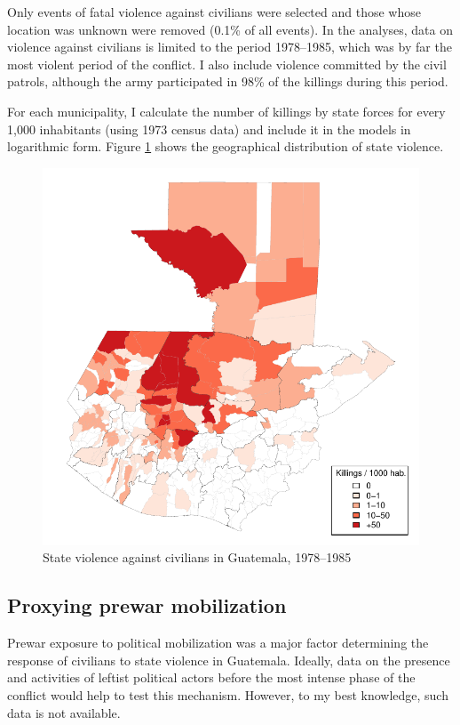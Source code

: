 \documentclass[12pt, notitlepage]{article}
\begin{document}

Only events of fatal violence against civilians were selected and those whose location was unknown were removed (0.1\% of all events).
In the analyses, data on violence against civilians is limited to the period 1978--1985, which was by far the most violent period of the conflict.
I also include violence committed by the civil patrols, although the army participated in 98\% of the killings during this period.

For each municipality, I calculate the number of killings by state forces for every 1,000 inhabitants (using 1973 census data) and include it in the models in logarithmic form.
Figure \ref{fig:map_govt_vi} shows the geographical distribution of state violence.

\begin{figure}[htb!]
  \centering
    \includegraphics[width = .4\textwidth]{img/map_govt_vi}

  \caption{State violence against civilians in Guatemala, 1978--1985} \label{fig:map_govt_vi}

\end{figure}

\subsection*{Proxying prewar mobilization}

Prewar exposure to political mobilization was a major factor determining the response of civilians to state violence in Guatemala.
Ideally, data on the presence and activities of leftist political actors before the most intense phase of the conflict would help to test this mechanism.
However, to my best knowledge, such data is not available.
\end{document}

